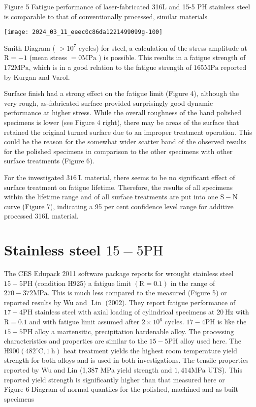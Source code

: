 \documentclass[10pt]{article}
\begin{document}
Figure 5 Fatigue performance of laser-fabricated 316L and 15-5 PH stainless steel is comparable to that of conventionally processed, similar materials

\begin{center}
\texttt{[image: 2024\_03\_11\_eeec0c86da1221499099g-100]}
\end{center}

Smith Diagram ( $>10^{7}$ cycles) for steel, a calculation of the stress amplitude at $\mathrm{R}=-1$ (mean stress $=0 \mathrm{MPa}$ ) is possible. This results in a fatigue strength of $172 \mathrm{MPa}$, which is in a good relation to the fatigue strength of $165 \mathrm{MPa}$ reported by Kurgan and Varol.

Surface finish had a strong effect on the fatigue limit (Figure 4), although the very rough, as-fabricated surface provided surprisingly good dynamic performance at higher stress. While the overall roughness of the hand polished specimens is lower (see Figure 4 right), there may be areas of the surface that retained the original turned surface due to an improper treatment operation. This could be the reason for the somewhat wider scatter band of the observed results for the polished specimens in comparison to the other specimens with other surface treatments (Figure 6).

For the investigated $316 \mathrm{~L}$ material, there seems to be no significant effect of surface treatment on fatigue lifetime. Therefore, the results of all specimens within the lifetime range and of all surface treatments are put into one $\mathrm{S}-\mathrm{N}$ curve (Figure 7), indicating a 95 per cent confidence level range for additive processed 316L material.

\section*{Stainless steel $15-5 \mathrm{PH}$}
The CES Edupack 2011 software package reports for wrought stainless steel $15-5 \mathrm{PH}$ (condition H925) a fatigue limit $(\mathrm{R}=0.1)$ in the range of $270-372 \mathrm{MPa}$. This is much less compared to the measured (Figure 5) or reported results by Wu and $\operatorname{Lin}$ (2002). They report fatigue performance of $17-4 \mathrm{PH}$ stainless steel with axial loading of cylindrical specimens at $20 \mathrm{~Hz}$ with $\mathrm{R}=0.1$ and with fatigue limit assumed after $2 \times 10^{6}$ cycles. $17-4 \mathrm{PH}$ is like the $15-5 \mathrm{PH}$ alloy a martensitic, precipitation hardenable alloy. The processing characteristics and properties are similar to the $15-5 \mathrm{PH}$ alloy used here. The $\mathrm{H} 900\left(482^{\circ} \mathrm{C}, 1 \mathrm{~h}\right)$ heat treatment yields the highest room temperature yield strength for both alloys and is used in both investigations. The tensile properties reported by Wu and Lin (1,387 MPa yield strength and $1,414 \mathrm{MPa}$ UTS). This reported yield strength is significantly higher than that measured here or\\
Figure 6 Diagram of normal quantiles for the polished, machined and as-built specimens
\end{document}
